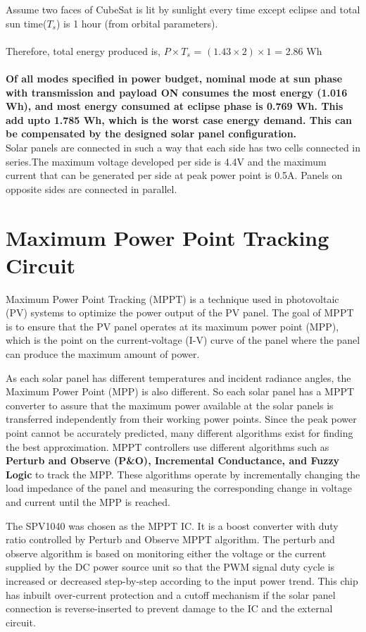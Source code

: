 Assume two faces of CubeSat is lit by sunlight every time except eclipse and total sun time($T_{s}$) is 1 hour (from orbital parameters).
\\ \\ Therefore, total energy produced is, $P \times  T_{s}$ = $(1.43 \times 2) \times 1$ = 2.86 Wh
\\ \\ \textbf{Of all modes specified in power budget, nominal mode at sun phase with transmission and payload ON consumes the most energy (1.016 Wh), and most energy consumed at eclipse phase is 0.769 Wh. This add upto 1.785 Wh, which is the worst case energy demand. This can be compensated by the designed solar panel configuration.}
\\
Solar panels are connected in such a way that each side has two cells connected in series.The maximum voltage developed per side is 4.4V and the maximum current that can be generated per side at peak power point is 0.5A.
Panels on opposite sides are connected in parallel.


\section[MPPT Circuit]{Maximum Power Point Tracking Circuit}

Maximum Power Point Tracking (MPPT) is a technique used in photovoltaic (PV) systems to optimize the power output of the PV panel. The goal of MPPT is to ensure that the PV panel operates at its maximum power point (MPP), which is the point on the current-voltage (I-V) curve of the panel where the panel can produce the maximum amount of power.

As each solar panel has different temperatures and incident radiance angles, the
Maximum Power Point (MPP) is also different. So each solar panel has a MPPT
converter to assure that the maximum power available at the solar panels is
transferred independently from their working power points. Since the peak power
point cannot be accurately predicted, many different algorithms exist for finding
the best approximation. MPPT controllers use different algorithms such as {\bf Perturb and Observe (P\&O), Incremental Conductance, and Fuzzy Logic} to track the MPP. These algorithms operate by incrementally changing the load impedance of the panel and measuring the corresponding change in voltage and current until the MPP is reached.

The SPV1040 was chosen as the MPPT IC. It is a boost converter with duty ratio controlled by Perturb and Observe MPPT algorithm. The perturb and observe algorithm is based on monitoring either the voltage or the current supplied by the DC power source unit so that the PWM signal duty cycle is increased or decreased step-by-step according to the input power trend. This chip has inbuilt over-current protection and a cutoff mechanism if the solar panel connection is reverse-inserted to prevent damage to the IC and the external circuit.

